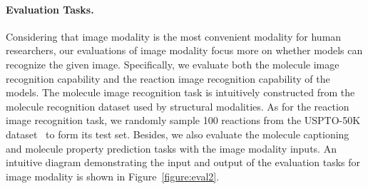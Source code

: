 \paragraph{Evaluation Tasks.} Considering that image modality is the most convenient modality for human researchers, our evaluations of image modality focus more on whether models can recognize the given image. Specifically, we evaluate both the molecule image recognition capability and the reaction image recognition capability of the models. The molecule image recognition task is intuitively constructed from the molecule recognition dataset used by structural modalities. As for the reaction image recognition task, we randomly sample 100 reactions from the USPTO-50K dataset~\cite{uspto} to form its test set. Besides, we also evaluate the molecule captioning and molecule property prediction tasks with the image modality inputs. An intuitive diagram demonstrating the input and output of the evaluation tasks for image modality is shown in Figure~\ref{figure:eval2}.

